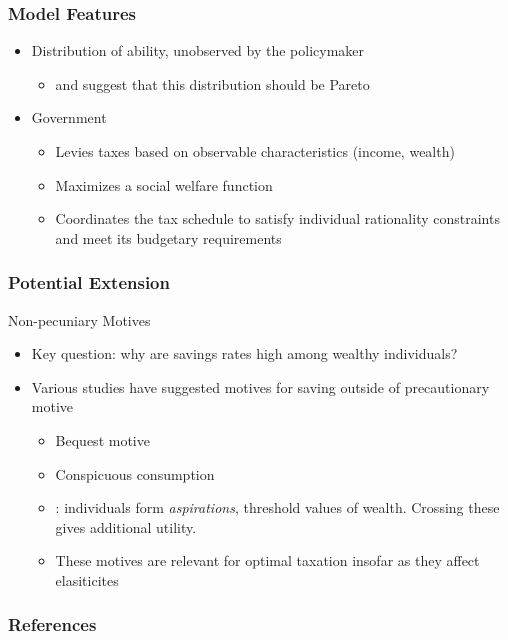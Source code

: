 \documentclass{beamer}
\begin{document}
\begin{frame}
    \frametitle{Model Features}

    \begin{itemize}
        \item Distribution of ability, unobserved by the policymaker
        \begin{itemize}
            \item \cite{diamond1998optimal} and \cite{saez2001using} suggest that this distribution should be Pareto 
        \end{itemize} 
        \item Government
        \begin{itemize}
            \item Levies taxes based on observable characteristics (income, wealth)
            \item Maximizes a social welfare function 
            \item Coordinates the tax schedule to satisfy individual rationality constraints and meet its budgetary requirements
        \end{itemize}
    \end{itemize}

\end{frame}

\begin{frame}
    \frametitle{Potential Extension}

    Non-pecuniary Motives
    \begin{itemize}
        \item Key question: why are savings rates high among wealthy individuals?
        \item Various studies have suggested motives for saving outside of precautionary motive
        \begin{itemize}
            \item Bequest motive 
            \item Conspicuous consumption
            \item \cite{genicot2017aspirations}: individuals form \textit{aspirations}, threshold values of wealth. Crossing these gives additional utility.
            \item These motives are relevant for optimal taxation insofar as they affect elasiticites
        \end{itemize}
    \end{itemize}

\end{frame}

\begin{frame}[allowframebreaks]
    \frametitle{References}

    
    

\end{frame}
\end{document}
